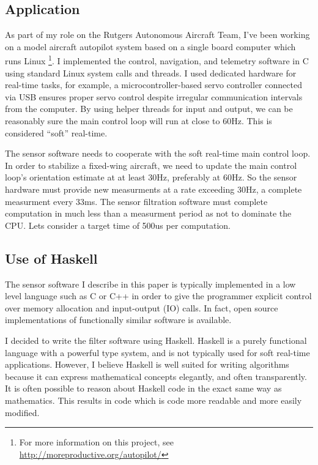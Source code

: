 \documentclass[12pt]{report}
\begin{document}
\subsection{Application}

As part of my role on the Rutgers Autonomous Aircraft Team, I've been working on a model aircraft autopilot system based on a single board computer which runs Linux \footnote{For more information on this project, see \url{http://moreproductive.org/autopilot/}}. I implemented the control, navigation, and telemetry software in C using standard Linux system calls and threads. I used dedicated hardware for real-time tasks, for example, a microcontroller-based servo controller connected via USB ensures proper servo control despite irregular communication intervals from the computer. 
By using helper threads for input and output, we can be reasonably sure the main control loop will run at close to 60Hz. This is considered ``soft'' real-time.

The sensor software needs to cooperate with the soft real-time main control loop. In order to stabilize a fixed-wing aircraft, we need to update the main control loop's orientation estimate at at least 30Hz, preferably at 60Hz. So the sensor hardware must provide new measurments at a rate exceeding 30Hz, a complete measurment every 33ms. The sensor filtration software must complete computation in much less than a measurment period as not to dominate the CPU. Lets consider a target time of 500us per computation.

\subsection{Use of Haskell}

The sensor software I describe in this paper is typically implemented in a low level language such as C or C++ in order to give the programmer explicit control over memory allocation and input-output (IO) calls. In fact, open source implementations of functionally similar software is available. 

I decided to write the filter software using Haskell. Haskell is a purely functional language with a powerful type system, and is not typically used for soft real-time applications. However, I believe Haskell is well suited for writing algorithms because it can express mathematical concepts elegantly, and often transparently. It is often possible to reason about Haskell code in the exact same way as mathematics. This results in code which is code more readable and more easily modified. 
\end{document}
